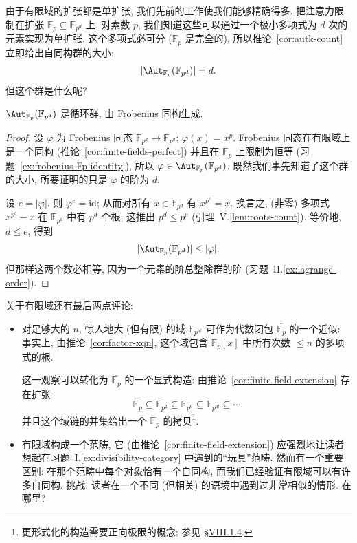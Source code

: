 由于有限域的扩张都是单扩张, 我们先前的工作使我们能够精确得多. 把注意力限制在扩张 $\mathbb{F}_p\subseteq\mathbb{F}_{p^d}$ 上, 对素数 $p$, 我们知道这些可以通过一个极小多项式为 $d$ 次的元素实现为单扩张. 这个多项式必可分 ($\mathbb{F}_p$ 是完全的), 所以推论~\ref{cor:autk-count} 立即给出自同构群的大小:
\[
|\Aut_{\mathbb{F}_p}(\mathbb{F}_{p^d})|=d.
\]
但这个群是什么呢?

\begin{proposition}\label{prop:aut-cyclic-frobenius}
$\Aut_{\mathbb{F}_p}(\mathbb{F}_{p^d})$ 是循环群, 由 Frobenius 同构生成.
\end{proposition}

\begin{proof}
设 $\varphi$ 为 Frobenius 同态 $\mathbb{F}_{p^d}\to\mathbb{F}_{p^d}$: $\varphi(x)=x^p$. Frobenius 同态在有限域上是一个同构 (推论~\ref{cor:finite-fields-perfect}) 并且在 $\mathbb{F}_p$ 上限制为恒等 (习题~\ref{ex:frobenius-Fp-identity}), 所以 $\varphi\in\Aut_{\mathbb{F}_p}(\mathbb{F}_{p^d})$. 既然我们事先知道了这个群的大小, 所要证明的只是 $\varphi$ 的阶为 $d$.

设 $e=|\varphi|$. 则 $\varphi^e=\mathrm{id}$; 从而对所有 $x\in\mathbb{F}_{p^d}$ 有 $x^{p^e}=x$. 换言之, (非零) 多项式 $x^{p^e}-x$ 在 $\mathbb{F}_{p^d}$ 中有 $p^d$ 个根; 这推出 $p^d\leq p^e$ (引理~V.\ref{lem:roots-count}). 等价地, $d\leq e$, 得到
\[
|\Aut_{\mathbb{F}_p}(\mathbb{F}_{p^d})|\leq|\varphi|.
\]
但那样这两个数必相等, 因为一个元素的阶总整除群的阶 (习题~II.\ref{ex:lagrange-order}).
\end{proof}

关于有限域还有最后两点评论:
\begin{itemize}
\item[—] 对足够大的 $n$, 惊人地大 (但有限) 的域 $\mathbb{F}_{p^{n!}}$ 可作为代数闭包 $\overline{\mathbb{F}_p}$ 的一个近似: 事实上, 由推论~\ref{cor:factor-xqn}, 这个域包含 $\mathbb{F}_p[x]$ 中所有次数 $\leq n$ 的多项式的根.

这一观察可以转化为 $\overline{\mathbb{F}_p}$ 的一个显式构造: 由推论~\ref{cor:finite-field-extension} 存在扩张
\[
\mathbb{F}_p\subseteq\mathbb{F}_{p^2}\subseteq\mathbb{F}_{p^6}\subseteq\mathbb{F}_{p^{4!}}\subseteq\cdots
\]
并且这个域链的并集给出一个 $\overline{\mathbb{F}_p}$ 的拷贝\footnote{更形式化的构造需要正向极限的概念; 参见 §\hyperref[subsec:limits-colimits]{VIII.1.4}.}.
\item[—] 有限域构成一个范畴, 它 (由推论~\ref{cor:finite-field-extension}) 应强烈地让读者想起在习题~I.\ref{ex:divisibility-category} 中遇到的``玩具''范畴. 然而有一个重要区别: 在那个范畴中每个对象恰有一个自同构, 而我们已经验证有限域可以有许多自同构. 挑战: 读者在一个不同 (但相关) 的语境中遇到过非常相似的情形. 在哪里?
\end{itemize}

